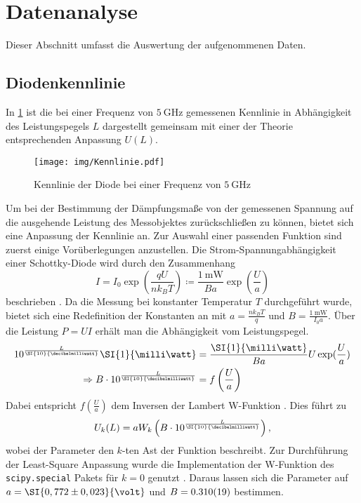 \section{Datenanalyse}

	Dieser Abschnitt umfasst die Auswertung der aufgenommenen Daten.

\subsection{Diodenkennlinie}
	
	In \cref{fig:kennlinie} ist die bei einer Frequenz von $\SI{5}{\giga\hertz}$ gemessenen Kennlinie in Abhängigkeit des Leistungspegels $L$ dargestellt gemeinsam mit einer der Theorie entsprechenden Anpassung $U(L)$.
	\begin{figure}[h]
		\centering
		\texttt{[image: img/Kennlinie.pdf]}
		\caption{Kennlinie der Diode bei einer Frequenz von $\SI{5}{\giga\hertz}$}
		\label{fig:kennlinie}
	\end{figure}	
	Um bei der Bestimmung der Dämpfungsmaße von der gemessenen Spannung auf die ausgehende Leistung des Messobjektes zurückschließen zu können, bietet sich eine Anpassung der Kennlinie an. 
	Zur Auswahl einer passenden Funktion sind zuerst einige Vorüberlegungen anzustellen. 
	Die Strom-Spannungabhängigkeit einer Schottky-Diode wird durch den Zusammenhang
	\begin{equation}
		I = I_0 \exp(\frac{q U}{n k_B T}) \coloneqq \frac{\SI{1}{\milli\watt}}{B a} \exp(\frac{U}{a})
		\label{eq:schottky}
	\end{equation}
	beschrieben \cite[S.~91]{schottky}. 
	Da die Messung bei konstanter Temperatur $T$ durchgeführt wurde, bietet sich eine Redefinition der Konstanten an mit $a=\frac{n k_B T}{q}$ und $B=\frac{\SI{1}{\milli\watt}}{I_0 a}$. 
	Über die Leistung $P=U I$ erhält man die Abhängigkeit vom Leistungspegel.
	\begin{align}
		10^{\frac{L}{\SI{10}{\decibelmilliwatt}}} \SI{1}{\milli\watt} &= \frac{\SI{1}{\milli\watt}}{B a} U \exp(\frac{U}{a}) \\
		\Rightarrow B\cdot 10^{\frac{L}{\SI{10}{\decibelmilliwatt}}} &=f\left(\frac{U}{a}\right)
	\end{align}
	Dabei entspricht $f\left(\frac{U}{a}\right)$ dem Inversen der Lambert W-Funktion \cite{lambertW}. 
	Dies führt zu
	\begin{equation}
		U_k(L)=a W_k\left(B\cdot 10^{\frac{L}{\SI{10}{\decibelmilliwatt}}}\right),
	\end{equation}
	wobei der Parameter den $k$-ten Ast der Funktion beschreibt. 
	Zur Durchführung der Least-Square Anpassung wurde die Implementation der W-Funktion des \texttt{scipy.special} Pakets für $k=0$ genutzt \cite{scipyLambertW}. 
	Daraus lassen sich die Parameter auf $a=\SI{0,772\pm0,023}{\volt}$ und $B=\SI{0,310\pm0,019}{}$ bestimmen. 

